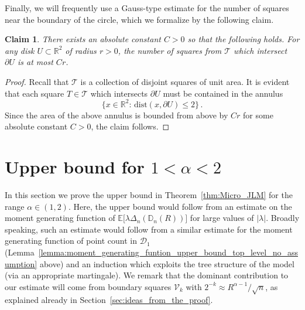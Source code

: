 \documentclass[11pt]{amsart}
\newtheorem{claim}[theorem]{Claim}
\theoremstyle{definition}
\theoremstyle{remark}
\numberwithin{equation}{section}
\def\la{{\lambda}}
\newcommand{\bR}{\mathbb R}
\newcommand{\bD}{\mathbb D}
\newcommand{\bE}{\mathbb E}
\begin{document}
	Finally, we will frequently use a Gauss-type estimate for the number of squares near the boundary of the circle, which we formalize by the following claim.
	\begin{claim}
		\label{claim:gauss_type_estimate}
		There exists an absolute constant $C>0$ so that the following holds. For any disk $U\subset \bR^2$ of radius $r>0$, the number of squares from $\mathcal{T}$ which intersect $\partial U$ is at most $Cr$. 
	\end{claim}
	\begin{proof}
		Recall that $\mathcal{T}$ is a collection of disjoint squares of unit area. It is evident that each square $T\in \mathcal{T}$ which intersects $\partial U$ must be contained in the annulus 
		\[
		\big\{ x\in \bR^2 : \, \text{dist}(x,\partial U) \le 2\big\}\, .
		\]
		Since the area of the above annulus is bounded from above by $Cr$ for some absolute constant $C>0$, the claim follows.
	\end{proof}
	\section{Upper bound for \texorpdfstring{$1< \alpha < 2$}{1 < alpha < 2}}
	\label{sec:UB_large_deviations}
	In this section we prove the upper bound in Theorem~\ref{thm:Micro_JLM} for the range $\alpha\in(1,2)$. Here, the upper bound would follow from an estimate on the moment generating function of $\bE\big[\la \Delta_n(\bD_n(R)) \big]$ for large values of $|\la|$. Broadly speaking, such an estimate would follow from a similar estimate for the moment generating function of point count in $\mathcal{D}_1$ (Lemma~\ref{lemma:moment_generating_funtion_upper_bound_top_level_no_assumption} above) and an induction which exploits the tree structure of the model (via an appropriate martingale). We remark that the dominant contribution to our estimate will come from boundary squares $\mathcal{V}_k$ with $2^{-k} \approx R^{\alpha-1}/\sqrt{n}$, as explained already in Section~\ref{sec:ideas_from_the_proof}.
	
\end{document}

